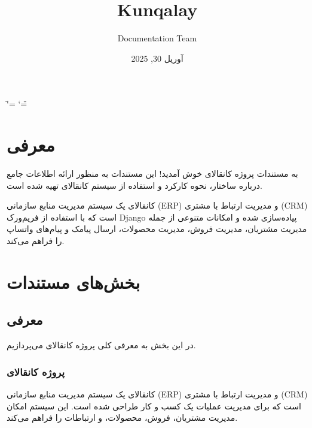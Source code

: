 \documentclass[letterpaper,10pt,english]{sphinxmanual}
\title{Kunqalay}
\date{آوریل 30, 2025}
\author{Documentation Team}
\begin{document}
\ifdefined\shorthandoff
  \ifnum\catcode`\=\string=\active\shorthandoff{=}\fi
  \ifnum\catcode`\"=\active{}\fi
\fi

\pagestyle{empty}
\sphinxmaketitle
\pagestyle{plain}
\sphinxtableofcontents
\pagestyle{normal}
\label{\detokenize{index::doc}}



\chapter{معرفی}
\label{\detokenize{index:id2}}
\sphinxAtStartPar
به مستندات پروژه کانقالای خوش آمدید! این مستندات به منظور ارائه اطلاعات جامع درباره ساختار، نحوه کارکرد و استفاده از سیستم کانقالای تهیه شده است.

\sphinxAtStartPar
کانقالای یک سیستم مدیریت منابع سازمانی (ERP) و مدیریت ارتباط با مشتری (CRM) است که با استفاده از فریم‌ورک Django پیاده‌سازی شده و امکانات متنوعی از جمله مدیریت مشتریان، مدیریت فروش، مدیریت محصولات، ارسال پیامک و پیام‌های واتساپ را فراهم می‌کند.


\chapter{بخش‌های مستندات}
\label{\detokenize{index:id3}}
\sphinxstepscope


\section{معرفی}
\label{\detokenize{introduction/index:introduction}}\label{\detokenize{introduction/index:id1}}\label{\detokenize{introduction/index::doc}}
\sphinxAtStartPar
در این بخش به معرفی کلی پروژه کانقالای می‌پردازیم.


\subsection{پروژه کانقالای}
\label{\detokenize{introduction/index:id2}}
\sphinxAtStartPar
کانقالای یک سیستم مدیریت منابع سازمانی (ERP) و مدیریت ارتباط با مشتری (CRM) است که برای مدیریت عملیات یک کسب و کار طراحی شده است. این سیستم امکان مدیریت مشتریان، فروش، محصولات، و ارتباطات را فراهم می‌کند.
\end{document}
